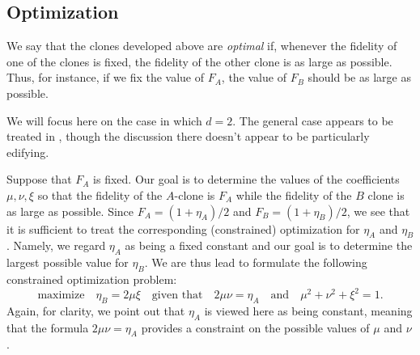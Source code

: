 \documentclass[reqno]{amsart}
\numberwithin{lemma}{section}
\numberwithin{proposition}{section}
\begin{document}
{\subsection{Optimization}
We say that the clones developed above are \emph{optimal} if, whenever the fidelity of one of the clones is fixed, the fidelity of the other clone is as large as possible. Thus, for instance, if we fix the value of $F_{A}$, the value of $F_{B}$ should be as large as possible. 

We will focus here on the case in which $d=2$. The general case appears to be treated in \cite{lamoureux2004asymmetric}, though the discussion there doesn't appear to be particularly edifying. 

Suppose that $F_{A}$ is fixed. Our goal is to determine the values of the coefficients $\mu, \nu, \xi$ so that the fidelity of the $A$-clone is $F_{A}$ while the fidelity of the $B$ clone is as large as possible. Since $F_{A} = (1 + \eta_{A})/2$ and $F_{B} = (1 + \eta_{B})/2$, we see that it is sufficient to treat the corresponding (constrained) optimization for $\eta_{A}$ and $\eta_{B}$. Namely, we regard $\eta_{A}$ as being a fixed constant and our goal is to determine the largest possible value for $\eta_{B}$. We are thus lead to formulate the following constrained optimization problem:
\begin{equation}
\label{opt_prob}
\text{maximize} \quad \eta_{B} =  2\mu \xi \quad \text{given that} \quad  2 \mu \nu = \eta_{A} \quad \text{and} \quad \mu^{2} + \nu^{2} + \xi^{2} = 1.
\end{equation}
Again, for clarity, we point out that $\eta_{A}$ is viewed here as being constant, meaning that the formula $2\mu \nu = \eta_{A}$ provides a constraint on the possible values of $\mu$ and $\nu$.

}
\end{document}
